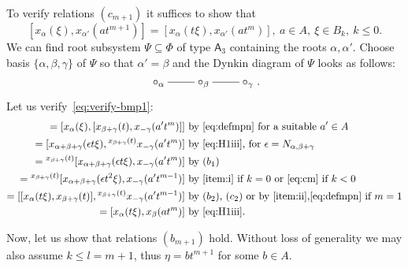 \documentclass[oneside, 10pt]{amsart}
\numberwithin{equation}{section}
\numberwithin{lemma}{section}
\theoremstyle{definition}
\theoremstyle{remark}
\begin{document}
To verify relations $(c_{m+1})$ it suffices to show that
\begin{equation}
\label{eq:verify-bmp1} [x_\alpha(\xi), x_{\alpha'}(at^{m+1})] = [x_\alpha(t\xi), x_{\alpha'}(at^m)],\ a \in A,\ \xi \in B_k,\ k\leq 0.
\end{equation}
We can find root subsystem $\Psi \subseteq \Phi$ of type $\mathsf{A}_3$ containing the roots $\alpha, \alpha'$.
Choose basis $\{\alpha,\beta,\gamma\}$ of $\Psi$ so that $\alpha'=\beta$ and the Dynkin diagram of $\Psi$ looks as follows:
\begin{equation}\label{eq:diagA3} \xymatrix{\circ_\alpha \ar@{-}[r] & \circ_\beta \ar@{-}[r] & \circ_\gamma}.\end{equation}
Let us verify~\eqref{eq:verify-bmp1}:
\begin{align*}
   [x_\alpha(\xi), x_\beta(at^{m+1})] = [x_\alpha(\xi), [x_{\beta + \gamma}(t), x_{-\gamma}(a't^m)]]&  \text{ by~\eqref{eq:defmpn} for a suitable $a'\in A$} \\ 
 = [x_{\alpha+\beta+\gamma}(\epsilon t\xi), {}^{x_{\beta+\gamma}(t)}x_{-\gamma}(a't^m)]             &  \text{ by~\eqref{eq:H1iii}, for $\epsilon=N_{\alpha, \beta+\gamma}$} \\
 = {}^{x_{\beta+\gamma}(t)}[x_{\alpha+\beta+\gamma}(\epsilon t\xi), x_{-\gamma}(a't^m)]             &  \text{ by $(b_1)$} \\
 = {}^{x_{\beta+\gamma}(t)}[x_{\alpha+\beta+\gamma}(\epsilon t^2\xi), x_{-\gamma}(a't^{m-1})]       &  \text{ by~\eqref{item:i} if $k=0$ or~\eqref{eq:cm} if $k <0$} \\
 = [[x_\alpha(t\xi), x_{\beta+\gamma}(t)], {}^{x_{\beta+\gamma}(t)} x_{-\gamma}(a't^{m-1})]         &  \text{ by~$(b_2)$, $(c_2)$ or by~\eqref{item:ii},\eqref{eq:defmpn} if $m=1$} \\
 = [x_\alpha(t\xi), x_\beta(at^m)]                                                                  &  \text{ by~\eqref{eq:H1iii}.}
\end{align*}

Now, let us show that relations $(b_{m+1})$ hold. 
Without loss of generality we may also assume $k \leq l=m+1$, thus $\eta = bt^{m+1}$ for some $b\in A$.
\end{document}
